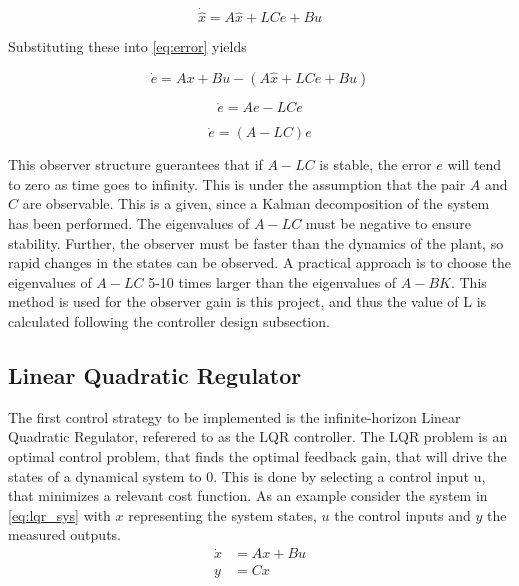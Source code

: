 \begin{equation}
	\dot{\hat{x}} = A\hat{x} + LCe + Bu
\end{equation}

Substituting these into \cref{eq:error} yields

\begin{equation}
	\dot{e} = Ax + Bu - ( A\hat{x} + LCe  + Bu)
\end{equation}

\begin{equation}
	\dot{e} = Ae - LCe
\end{equation}

\begin{equation} \label{eq:obs_error_dot}
	\dot{e} = (A-LC)e
\end{equation}

This observer structure guerantees that if $A-LC$ is stable, the error $e$ will tend to zero as time goes to infinity. This is under the assumption that the pair $A$ and $C$ are observable. This is a given, since a Kalman decomposition of the system has been performed. The eigenvalues of $A-LC$ must be negative to ensure stability. Further, the observer must be faster than the dynamics of the plant, so rapid changes in the states can be observed. A practical approach is to choose the eigenvalues of $A-LC$ 5-10 times larger than the eigenvalues of $A-BK$. This method is used for the observer gain is this project, and thus the value of L is calculated following the controller design subsection.

\subsection{Linear Quadratic Regulator}
The first control strategy to be implemented is the infinite-horizon Linear Quadratic Regulator, referered to as the LQR controller. The LQR problem is an optimal control problem, that finds the optimal feedback gain, that will drive the states of a dynamical system to 0. This is done by selecting a control input u, that minimizes a relevant cost function. As an example consider the system in \cref{eq:lqr_sys} with $x$ representing the system states, $u$ the control inputs and $y$ the measured outputs.\\

\begin{equation} \label{eq:lqr_sys}
	\begin{split}
		\dot{x} 	& = Ax + Bu \\
		y 	& = Cx
	\end{split}
\end{equation}

